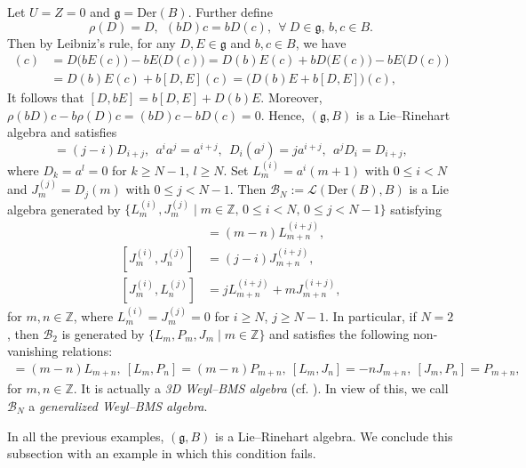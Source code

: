 \documentclass[12pt]{article}
\numberwithin{equation}{section}
\theoremstyle{definition}
\theoremstyle{plain}
\newcommand{\bZ}{\ensuremath{\mathbb{Z}}}
\newcommand{\fg}{\mathfrak{g}}
\newcommand{\Der}{\mathrm{Der }}
\newcommand{\cL}{\ensuremath{\mathcal{L}}}
\begin{document}
Let $U=Z=0$ and $\fg=\Der(B)$. Further define 
\begin{equation*}
    \rho(D)=D,\ \ (bD)c=b  D(c),\ \ \forall\ D\in\fg,\, b,c\in B.
\end{equation*}
Then by Leibniz's rule, for any $D,E\in\fg$ and $b,c\in B$, we have
\begin{align*}
    [D,bE](c)&=D\big(bE(c)\big)-bE\big(D(c)\big)=D(b)E(c)+bD\big(E(c)\big)-bE\big(D(c)\big)\\
    &=D(b)E(c)+b[D,E](c)=\big(D(b)E+b[D,E]\big)(c),
\end{align*}
It follows that $[D,bE]=b[D,E]+D(b)E$. Moreover, $\rho(bD)c-b \rho(D)c=(bD)c-b D(c)=0$. Hence, $(\fg,B)$ is a Lie--Rinehart algebra and satisfies
\begin{equation*}
    [D_i,D_j]=(j-i)D_{i+j},\ \ a^i  a^j=a^{i+j},\ \ D_i(a^j)=ja^{i+j},\ \ a^jD_i=D_{i+j},
\end{equation*}
where $D_k=a^l=0$ for $k\ge N-1$, $l\ge N$. Set $L_m^{(i)}=a^i(m+1)$ with $0\le i<N$ and $J_m^{(j)}=D_j(m)$ with $0\le j<N-1$. Then $\mathcal{B}_N:=\cL(\Der(B),B)$ is a Lie algebra generated by $\{ L_m^{(i)},J_m^{(j)}\mid m\in\bZ,\, 0\le i<N,\, 0\le j<N-1\}$ satisfying
\begin{align*}
    [L_m^{(i)},L_n^{(j)}]&=(m-n)L_{m+n}^{(i+j)},\\
    [J_m^{(i)},J_n^{(j)}]&=(j-i)J_{m+n}^{(i+j)},\\
    [J_m^{(i)},L_n^{(j)}]&=jL_{m+n}^{(i+j)}+mJ_{m+n}^{(i+j)},
\end{align*}
for $m,n\in\bZ$, where $L_m^{(i)}=J_m^{(j)}=0$ for $i\ge N$, $j\ge N-1$. In particular, if $N=2$, then $\mathcal{B}_2$ is generated by $\{L_m,P_m,J_m\mid m\in\bZ\}$ and satisfies the following non-vanishing relations:
\begin{align*}
    [L_m,L_n]=(m-n)L_{m+n},\ [L_m,P_n]=(m-n)P_{m+n},\ [L_m,J_n]=-nJ_{m+n},\ [J_m,P_n]=P_{m+n},
\end{align*}
for $m,n\in\bZ$. It is actually a \emph{3D Weyl--BMS algebra} (cf. \cite{AST,Yang}). In view of this, we call $\mathcal{B}_N$ a \emph{generalized Weyl--BMS algebra}.

In all the previous examples, $(\fg,B)$ is a Lie--Rinehart algebra. We conclude this subsection with an example in which this condition fails.
\end{document}

